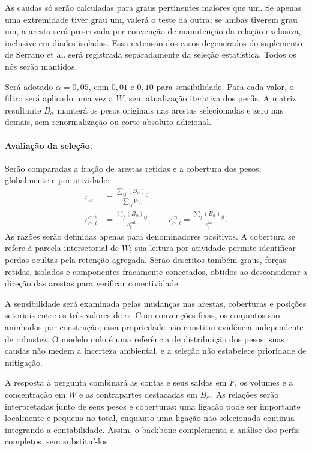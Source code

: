 \documentclass[12pt]{article}
\begin{document}
As caudas só serão calculadas para graus pertinentes maiores que um. Se apenas uma extremidade tiver grau um, valerá o teste da outra; se ambas tiverem grau um, a aresta será preservada por convenção de manutenção da relação exclusiva, inclusive em díades isoladas. Essa extensão dos casos degenerados do suplemento de Serrano et al. será registrada separadamente da seleção estatística. Todos os nós serão mantidos.

Será adotado $\alpha=0{,}05$, com $0{,}01$ e $0{,}10$ para sensibilidade. Para cada valor, o filtro será aplicado uma vez a $W$, sem atualização iterativa dos perfis. A matriz resultante $B_\alpha$ manterá os pesos originais nas arestas selecionadas e zero nas demais, sem renormalização ou corte absoluto adicional.

\paragraph{Avaliação da seleção.}
Serão comparadas a fração de arestas retidas e a cobertura dos pesos, globalmente e por atividade:
\begin{equation}
\begin{aligned}
r_\alpha&=\frac{\sum_{ij}(B_\alpha)_{ij}}{\sum_{ij}W_{ij}},\\
r_{\alpha,i}^{\mathrm{out}}&=\frac{\sum_j(B_\alpha)_{ij}}{s_i^{\mathrm{out}}},\qquad
r_{\alpha,i}^{\mathrm{in}}=\frac{\sum_j(B_\alpha)_{ji}}{s_i^{\mathrm{in}}}.
\end{aligned}
\label{eq:cobertura-backbone}
\end{equation}
As razões serão definidas apenas para denominadores positivos. A cobertura se refere à parcela intersetorial de $W$; sua leitura por atividade permite identificar perdas ocultas pela retenção agregada. Serão descritos também graus, forças retidas, isolados e componentes fracamente conectados, obtidos ao desconsiderar a direção das arestas para verificar conectividade.

A sensibilidade será examinada pelas mudanças nas arestas, coberturas e posições setoriais entre os três valores de $\alpha$. Com convenções fixas, os conjuntos são aninhados por construção; essa propriedade não constitui evidência independente de robustez. O modelo nulo é uma referência de distribuição dos pesos: suas caudas não medem a incerteza ambiental, e a seleção não estabelece prioridade de mitigação.

A resposta à pergunta combinará as contas e seus saldos em $F$, os volumes e a concentração em $W$ e as contrapartes destacadas em $B_\alpha$. As relações serão interpretadas junto de seus pesos e coberturas: uma ligação pode ser importante localmente e pequena no total, enquanto uma ligação não selecionada continua integrando a contabilidade. Assim, o backbone complementa a análise dos perfis completos, sem substituí-los.
\end{document}
